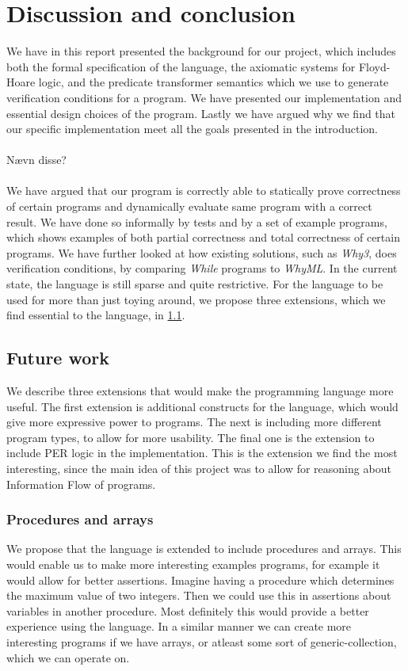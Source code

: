 \section{Discussion and conclusion}\label{sec:conclusion}
We have in this report presented the background for our project, which includes both the formal specification of the language, the axiomatic systems for Floyd-Hoare logic, and the predicate transformer semantics which we use to generate verification conditions for a program.
We have presented our implementation and essential design choices of the program.
Lastly we have argued why we find that our specific implementation meet all the goals presented in the introduction.
\\~\\
Nævn disse?
\\~\\
We have argued that our program is correctly able to statically prove correctness of certain programs and dynamically evaluate same program with a correct result. 
We have done so informally by tests and by a set of example programs, which shows examples of both partial correctness and total correctness of certain programs.
We have further looked at how existing solutions, such as \textit{Why3}, does verification conditions, by comparing \textit{While} programs to \textit{WhyML}.
In the current state, the language is still sparse and quite restrictive. 
For the language to be used for more than just toying around, we propose three extensions, which we find essential to the language, in \cref{sec:future}.

\subsection{Future work}\label{sec:future}
We describe three extensions that would make the programming language more useful. 
The first extension is additional constructs for the language, which would give more expressive power to programs. 
The next is including more different program types, to allow for more usability. 
The final one is the extension to include PER logic in the implementation. This is the extension we find the most interesting, since the main idea of this project was to allow for reasoning about Information Flow of programs.

\subsubsection{Procedures and arrays}
We propose that the language is extended to include procedures and arrays. 
This would enable us to make more interesting examples programs, for example it would allow for better assertions. 
Imagine having a procedure which determines the maximum value of two integers. 
Then we could use this in assertions about variables in another procedure. 
Most definitely this would provide a better experience using the language. 
In a similar manner we can create more interesting programs if we have arrays, or atleast some sort of generic-collection, which we can operate on.

